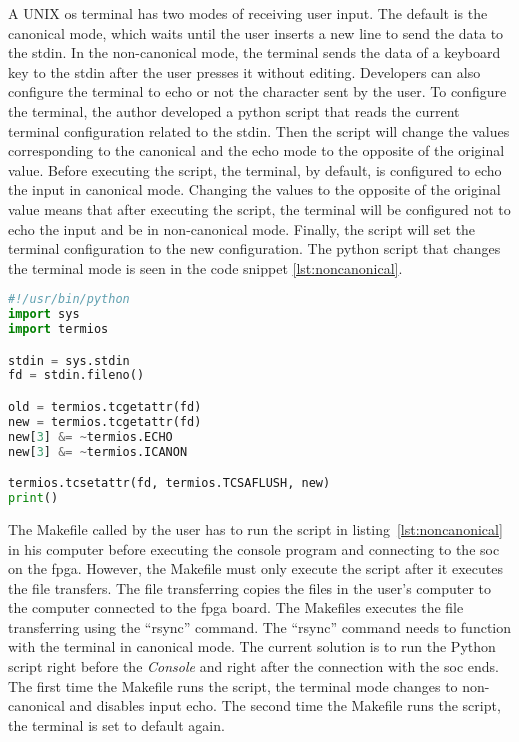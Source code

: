 A UNIX \acrshort{os} terminal has two modes of receiving user input. The default is the canonical mode, which waits until the user inserts a new line to send the data to the stdin. In the non-canonical mode, the terminal sends the data of a keyboard key to the stdin after the user presses it without editing. Developers can also configure the terminal to echo or not the character sent by the user. To configure the terminal, the author developed a python script that reads the current terminal configuration related to the stdin. Then the script will change the values corresponding to the canonical and the echo mode to the opposite of the original value. Before executing the script, the terminal, by default, is configured to echo the input in canonical mode. Changing the values to the opposite of the original value means that after executing the script, the terminal will be configured not to echo the input and be in non-canonical mode. Finally, the script will set the terminal configuration to the new configuration. The python script that changes the terminal mode is seen in the code snippet \ref{lst:noncanonical}.

\begin{lstlisting}[language=Python, caption={Enable or disable non-canonical mode.}, label=lst:noncanonical]
#!/usr/bin/python
import sys
import termios

stdin = sys.stdin
fd = stdin.fileno()

old = termios.tcgetattr(fd)
new = termios.tcgetattr(fd)
new[3] &= ~termios.ECHO
new[3] &= ~termios.ICANON

termios.tcsetattr(fd, termios.TCSAFLUSH, new)
print()
\end{lstlisting}

The Makefile called by the user has to run the script in listing~\ref{lst:noncanonical} in his computer before executing the console program and connecting to the \acrshort{soc} on the \acrshort{fpga}. However, the Makefile must only execute the script after it executes the file transfers. The file transferring copies the files in the user's computer to the computer connected to the \acrshort{fpga} board. The Makefiles executes the file transferring using the \enquote{rsync} command. The \enquote{rsync} command needs to function with the terminal in canonical mode. The current solution is to run the Python script right before the \textit{Console} and right after the connection with the \acrshort{soc} ends. The first time the Makefile runs the script, the terminal mode changes to non-canonical and disables input echo. The second time the Makefile runs the script, the terminal is set to default again.
